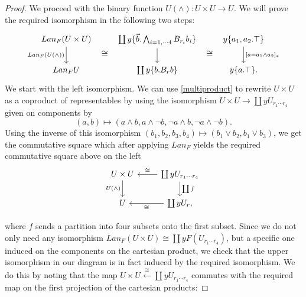 \documentclass[a4paper]{amsproc}
\theoremstyle{plain}
\theoremstyle{definition}
\theoremstyle{remark}
\numberwithin{equation}{section}
\begin{document}
\begin{proof}
We proceed with the binary function $U(\wedge): U \times U \to U$. We will prove the required isomorphism in the following two steps:
\[
\begin{tikzcd}
Lan_F(U \times U) \arrow[d, "Lan_F(U(\wedge))"'] \arrow[r, phantom, shift right=7, "\cong"] & {\coprod y \{\vec{b}.\bigwedge_{i=1,\cdots 4} B_{r_i} b_i\}} \arrow[d] \arrow[r, phantom, shift right=7, "\cong"] & {y \{a_1,a_2.\top\}} \arrow[d, "{[a = a_1 \wedge a_2]_*}"] \\
Lan_F U                                          & \coprod y \{b.B_rb\} & y\{a.\top\} .
\end{tikzcd}
\]
We start with the left isomorphism. We can use \ref{multiproduct} to rewrite $U \times U$ as a coproduct of representables by using the isomorphism $U \times U \to \coprod y U_{r_1 \cdots r_4}$ given on components by 
\[
(a,b) \mapsto (a \wedge b, a \wedge \neg b, \neg a \wedge b, \neg a \wedge \neg b) .
\]
Using the inverse of this isomorphism $(b_1,b_2,b_3,b_4) \mapsto (b_1 \vee b_2, b_1 \vee b_3)$, we get the commutative square which after applying $Lan_F$ yields the required commutative square above on the left
\[
\begin{tikzcd}
U \times U \arrow[d, "U(\wedge)"'] & \coprod y U_{r_1 \cdots r_4} \arrow[d, "\coprod f"] \arrow[l, "\cong"'] \\
U                                  & \coprod y U_r \arrow[l, "\cong"]                          ,
\end{tikzcd}
\]

where $f$ sends a partition into four subsets onto the first subset. Since we do not only need any isomorphism $Lan_F (U \times U) \cong \coprod y F (U_{r_1 \cdots r_4})$, but a specific one induced on the components on the cartesian product, we check that the upper isomorphism in our diagram is in fact induced by the required isomorphism. We do this by noting that the map $U \times U \xleftarrow{\cong} \coprod y U_{r_1 \cdots r_4}$ commutes with the required map on the first projection of the cartesian products:


\end{proof}
\end{document}
